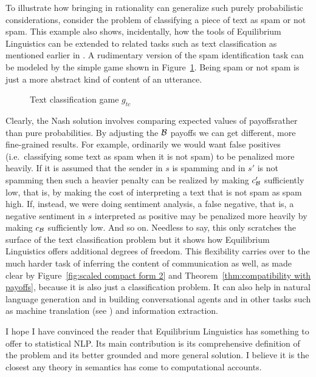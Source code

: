 To illustrate how bringing in rationality can generalize such purely probabilistic considerations, consider the problem of classifying a piece of text as spam or not spam. This example also shows, incidentally, how the tools of Equilibrium Linguistics can be extended to related tasks such as text classification as mentioned earlier in . A rudimentary version of the spam identification task can be modeled by the simple game shown in Figure~\ref{fig:text classification game}. Being spam or not spam is just a more abstract kind of content of an utterance.

\begin{figure}[h] 

\caption{Text classification game $g_{tc}$}
\label{fig:text classification game}
\end{figure}

Clearly, the Nash solution involves comparing expected values of payoffs\linebreak rather than pure probabilities. By adjusting the $\cal B$ payoffs we can get different, more fine-grained results. For example, ordinarily we would want false positives (i.e.\ classifying some text as spam when it is not spam) to be penalized more heavily. If it is assumed that the sender in $s$ is spamming and in $s'$ is not spamming then such a heavier penalty can be realized by making $c'_{\cal B}$ sufficiently low, that is, by making the cost of interpreting a text that is not spam as spam high. If, instead, we were doing sentiment analysis, a false negative, that is, a negative sentiment in $s$ interpreted as positive may be penalized more heavily by making $c_{\cal B}$ sufficiently low. And so on.  Needless to say, this only scratches the surface of the text classification problem but it shows how Equilibrium Linguistics offers additional degrees of freedom. This flexibility carries over to the much harder task of inferring the content of communication as well, as made clear by Figure~\ref{fig:scaled compact form 2} and Theorem~\ref{thm:compatibility with payoffs}, because it is also just a classification problem. It can also help in natural language generation and in building conversational agents and in other tasks such as machine translation (see ) and information extraction.

I hope I have convinced the reader that Equilibrium Linguistics has something to offer to statistical NLP. Its main contribution is its comprehensive definition of the problem and its better grounded and more general solution. I believe it is the closest any theory in  semantics has come to computational accounts.

